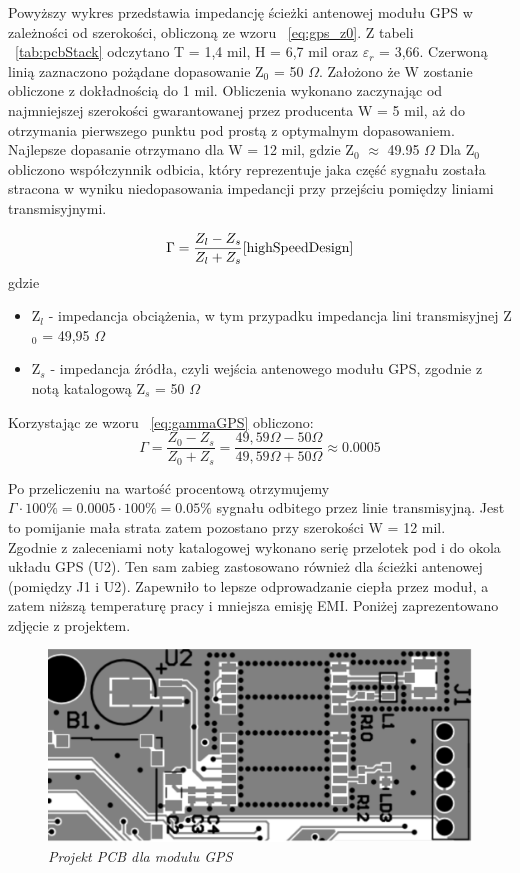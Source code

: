 \documentclass[eng,printmode]{mgr}
\begin{document}
Powyższy wykres przedstawia impedancję ścieżki antenowej modułu GPS w zależności od szerokości, obliczoną ze wzoru ~\ref{eq:gps_z0}. Z tabeli ~\ref{tab:pcbStack} odczytano T = 1,4 mil, H = 6,7 mil oraz \textbf{$\varepsilon_r$} = 3,66. Czerwoną linią zaznaczono pożądane dopasowanie Z$_0$ = 50 $\Omega$. Założono że W zostanie obliczone z dokładnością do 1 mil. Obliczenia wykonano zaczynając od najmniejszej szerokości gwarantowanej przez producenta W = 5 mil, aż do otrzymania pierwszego punktu pod prostą z optymalnym dopasowaniem. Najlepsze dopasanie otrzymano dla W = 12 mil, gdzie Z$_0$ $\approx$ 49.95 $\Omega$
Dla Z$_0$ obliczono współczynnik odbicia, który reprezentuje jaka część sygnału została stracona w wyniku niedopasowania impedancji przy przejściu pomiędzy liniami transmisyjnymi.

\begin{equation}
\Gamma= \frac{Z_l - Z_s}{Z_l + Z_s} \label{eq:gammaGPS} \cite{highSpeedDesign}
\end{equation}
gdzie
\begin{itemize}
  \item Z$_l$ - impedancja obciążenia, w tym przypadku impedancja lini transmisyjnej Z$_0$ = 49,95 $ \Omega$
  \item Z$_s$ - impedancja źródła, czyli wejścia antenowego modułu GPS, zgodnie z notą katalogową Z$_s$ = 50 $\Omega$
\end{itemize}
\noindent
Korzystając ze wzoru ~\ref{eq:gammaGPS} obliczono:
\begin{equation}
\Gamma= \frac{Z_0 - Z_s}{Z_0 + Z_s} = \frac{49,59\Omega -50\Omega}{49,59\Omega  + 50\Omega } \approx 0.0005 
\end{equation}

Po przeliczeniu na wartość procentową otrzymujemy $\Gamma \cdot 100\% = 0.0005 \cdot 100\% = 0.05\%$ sygnału odbitego przez linie transmisyjną. Jest to pomijanie mała strata zatem pozostano przy szerokości W = 12 mil.\\

Zgodnie z zaleceniami noty katalogowej wykonano serię przelotek pod i do okola układu GPS (U2). Ten sam zabieg zastosowano również dla ścieżki antenowej (pomiędzy J1 i U2). Zapewniło to lepsze odprowadzanie ciepła przez moduł, a zatem niższą temperaturę pracy i mniejsza emisję EMI. Poniżej zaprezentowano zdjęcie z projektem.
\begin{figure}[!h]
    \centering
    \includegraphics[width=15cm]{pcb/gps.png}
    \caption{\textit{Projekt PCB dla modułu GPS}}
\end{figure}
\end{document}

